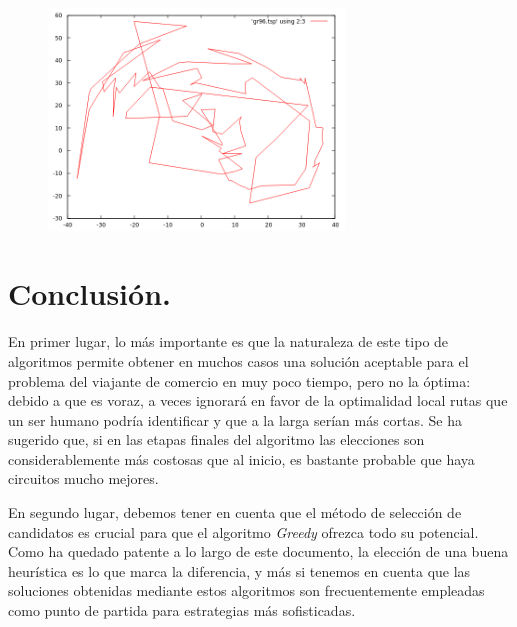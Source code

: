 \documentclass[11pt,a4paper]{article}
\begin{document}
				\vspace{5mm}

				\begin{figure}[h]

					\centering
					\includegraphics[width=0.7\textwidth]{gr96IR.png}
					
				\end{figure}

\newpage

	\section{Conclusión.}

		\par
		En primer lugar, lo más importante es que la naturaleza de este tipo de algoritmos permite obtener en muchos casos una solución aceptable para el problema del viajante de comercio en muy poco tiempo, pero no la óptima: debido a que es voraz, a veces ignorará en favor de la optimalidad local rutas que un ser humano podría identificar y que a la larga serían más cortas. Se ha sugerido que, si en las etapas finales del algoritmo las elecciones son considerablemente más costosas que al inicio, es bastante probable que haya circuitos mucho mejores.

		\par
		En segundo lugar, debemos tener en cuenta que el método de selección de candidatos es crucial para que el algoritmo \textit{Greedy} ofrezca todo su potencial. Como ha quedado patente a lo largo de este documento, la elección de una buena heurística es lo que marca la diferencia, y más si tenemos en cuenta que las soluciones obtenidas mediante estos algoritmos son frecuentemente empleadas como punto de partida para estrategias más sofisticadas.
\end{document}
